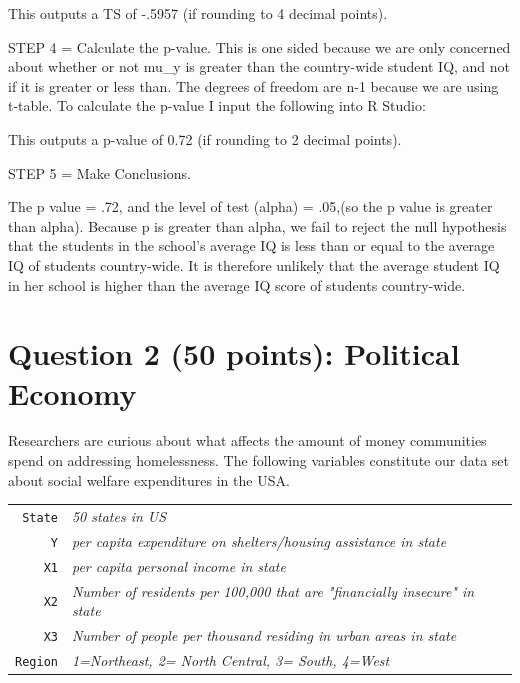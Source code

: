 \documentclass[12pt,letterpaper]{article}
\begin{document}
\begin{enumerate}
		
		
		This outputs a TS of -.5957 (if rounding to 4 decimal points).
		
		STEP 4 = Calculate the p-value. This is one sided because we are only concerned about whether or not mu\_y is greater than the country-wide student IQ, and not if it is greater or less than.
		The degrees of freedom are n-1  because we are using t-table.
		To calculate the p-value I input the following into R Studio:
		
		
		
		This outputs a p-value of 0.72 (if rounding to 2 decimal points).
		
		STEP 5 = Make Conclusions.
		
		The p value = .72, and the level of test (alpha) = .05,(so the p value is greater than alpha).
		Because p is greater than alpha, we fail to reject the null hypothesis that the students in the school's average IQ is less than or equal to the average IQ of students country-wide. It is therefore unlikely that the average student IQ in her school is higher than the average IQ score of students country-wide. 
		
		
		
		
		
	\end{enumerate}
	
	\newpage
	
	\section*{Question 2 (50 points): Political Economy}
	
	\noindent Researchers are curious about what affects the amount of money communities spend on addressing homelessness. The following variables constitute our data set about social welfare expenditures in the USA. \\
	\vspace{.5cm}
	
	
	\begin{tabular}{r|l}
		\texttt{State} &\emph{50 states in US} \\
		\texttt{Y} & \emph{per capita expenditure on shelters/housing assistance in state}\\
		\texttt{X1} &\emph{per capita personal income in state} \\
		\texttt{X2} &  \emph{Number of residents per 100,000 that are "financially insecure" in state}\\
		\texttt{X3} &  \emph{Number of people per thousand residing in urban areas in state} \\
		\texttt{Region} &  \emph{1=Northeast, 2= North Central, 3= South, 4=West} \\
	\end{tabular}
	
\end{document}
